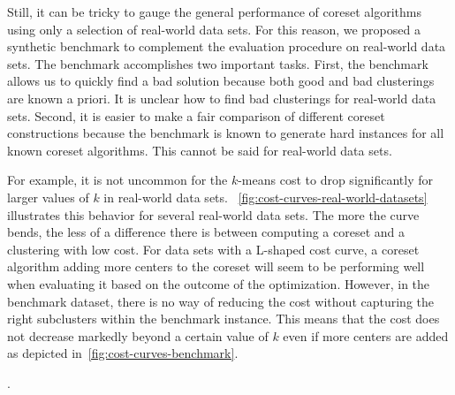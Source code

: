 Still, it can be tricky to gauge the general performance of coreset algorithms using only a selection of real-world data sets. For this reason, we proposed a synthetic benchmark to complement the evaluation procedure on real-world data sets. The benchmark accomplishes two important tasks.
% 
First, the benchmark allows us to quickly find a bad solution because both good and bad clusterings are known a priori. It is unclear how to find bad clusterings for real-world data sets.
% 
Second, it is easier to make a fair comparison of different coreset constructions because the benchmark is known to generate hard instances for all known coreset algorithms. This cannot be said for real-world data sets.

%
For example, it is not uncommon for the $k$-means cost to drop significantly for larger values of $k$ in real-world data sets.
~\cref{fig:cost-curves-real-world-datasets} illustrates this behavior for several real-world data sets. The more the curve bends, the less of a difference there is between computing a coreset and a clustering with low cost. For data sets with a L-shaped cost curve, a coreset algorithm adding more centers to the coreset will seem to be performing well when evaluating it based on the outcome of the optimization. However, in the benchmark dataset, there is no way of reducing the cost without capturing the right subclusters within the benchmark instance. This means that the cost does not decrease markedly beyond a certain value of $k$ even if more centers are added as depicted in~\cref{fig:cost-curves-benchmark}.

.


